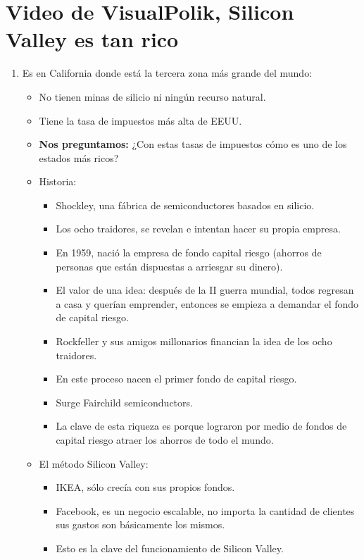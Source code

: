 \section{Video de VisualPolik, Silicon Valley es tan rico}
\begin{enumerate}
    \item Es en California donde está la tercera zona más grande del mundo: 
        \begin{itemize}
            \item No tienen minas de silicio ni ningún recurso natural.
            \item Tiene la tasa de impuestos más alta de EEUU.
            \item \textbf{Nos preguntamos:} ¿Con estas tasas de impuestos cómo es uno de los estados más ricos?
            \item Historia:
                \begin{itemize}
                    \item Shockley, una fábrica de semiconductores basados en silicio.
                    \item Los ocho traidores, se revelan e intentan hacer su propia empresa.
                    \item En 1959, nació la empresa de fondo capital riesgo (ahorros de personas que están dispuestas a arriesgar su dinero).
                    \item El valor de una idea: después de la II guerra mundial, todos regresan a casa y querían emprender, entonces se empieza a demandar el fondo de capital riesgo.
                    \item Rockfeller y sus amigos millonarios financian la idea de los ocho traidores.
                    \item En este proceso nacen el primer fondo de capital riesgo.
                    \item Surge Fairchild semiconductors.
                    \item La clave de esta riqueza es porque lograron por medio de fondos de capital riesgo atraer los ahorros de todo el mundo.
                \end{itemize}
            
            \item El método Silicon Valley: 
                \begin{itemize}
                    \item IKEA, sólo crecía con sus propios fondos.
                    \item Facebook, es un negocio escalable, no importa la cantidad de clientes sus gastos son básicamente los mismos.
                    \item Esto es la clave del funcionamiento de Silicon Valley.
                \end{itemize}
            

\end{itemize}
\end{enumerate}
